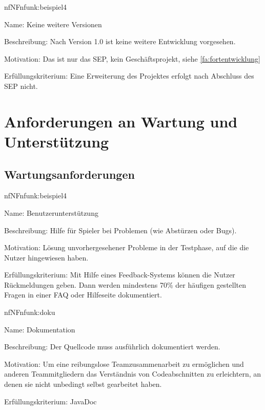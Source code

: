 \begin{description}[leftmargin=5em, style=sameline]	
	\begin{lhp}{nf}{NF}{nfunk:beispiel4}
		\item [Name:] Keine weitere Versionen
		\item [Beschreibung:] Nach Version 1.0 ist keine weitere Entwicklung vorgesehen.
		\item [Motivation:] Das ist nur das SEP, kein Geschäftsprojekt, siehe \ref{fa:fortentwicklung}
		\item [Erfüllungskriterium:] Eine Erweiterung des Projektes erfolgt nach Abschluss des SEP nicht.
	\end{lhp}
\end{description}

\section{Anforderungen an Wartung und Unterstützung}

\subsection{Wartungsanforderungen}

\begin{description}[leftmargin=5em, style=sameline]	
	\begin{lhp}{nf}{NF}{nfunk:beispiel4}
		\item [Name:] Benutzerunterstützung
		\item [Beschreibung:] Hilfe für Spieler bei Problemen (wie Abstürzen oder Bugs).
		\item [Motivation:] Lösung unvorhergesehener Probleme in der Testphase, auf die die Nutzer hingewiesen haben.
		\item [Erfüllungskriterium:] Mit Hilfe eines Feedback-Systems können die Nutzer Rückmeldungen geben. Dann werden mindestens 70\% der häufigen gestellten Fragen in einer FAQ oder Hilfeseite dokumentiert.
	\end{lhp}
\end{description}

\begin{description}[leftmargin=5em, style=sameline]	
	\begin{lhp}{nf}{NF}{nfunk:doku}
		\item [Name:] Dokumentation
		\item [Beschreibung:] Der Quellcode muss ausführlich dokumentiert werden.
		\item [Motivation:] Um eine reibungslose Teamzusammenarbeit zu ermöglichen und anderen Teammitgliedern das Verständnis von Codeabschnitten zu erleichtern, an denen sie nicht unbedingt selbst gearbeitet haben.
		\item [Erfüllungskriterium:] JavaDoc 
	\end{lhp}
\end{description}

